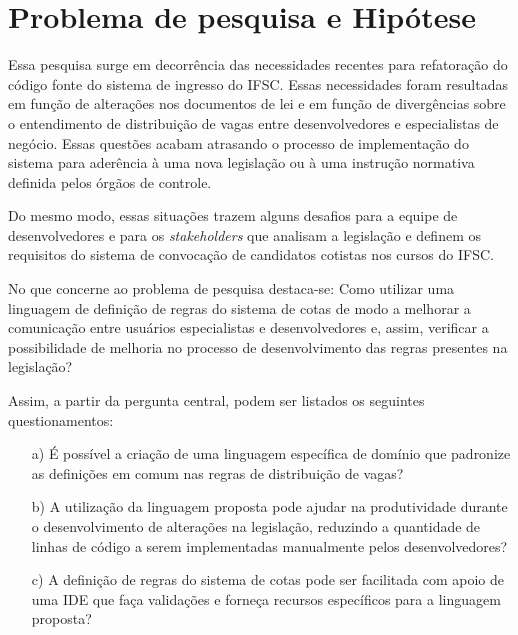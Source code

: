 \section{Problema de pesquisa e Hipótese}
\label{problema}

Essa pesquisa surge em decorrência das necessidades recentes para refatoração do código fonte do sistema de ingresso do \gls{IFSC}. Essas necessidades foram resultadas em função de alterações nos documentos de lei e em função de  divergências sobre o entendimento de distribuição de vagas entre desenvolvedores e especialistas de negócio. Essas questões acabam atrasando o processo de implementação do sistema para aderência à uma nova legislação ou à uma instrução normativa definida pelos órgãos de controle.

Do mesmo modo, essas situações trazem alguns desafios para a equipe de desenvolvedores e para os \textit{stakeholders} que analisam a legislação e definem os requisitos do sistema de convocação de candidatos cotistas nos cursos do \gls{IFSC}. 

No que concerne ao problema de pesquisa destaca-se: 
Como utilizar uma linguagem de definição de regras do sistema de cotas de modo a melhorar a comunicação entre usuários especialistas e desenvolvedores e, assim, verificar a possibilidade de melhoria no processo de desenvolvimento das regras presentes na legislação?

Assim, a partir da pergunta central, podem ser listados os seguintes questionamentos:

\begin{enumerate}
    
    \item[a)] É possível a criação de uma linguagem específica de domínio que padronize as definições em comum nas regras de distribuição de vagas?
    
    \item[b)] A utilização da linguagem proposta pode ajudar na produtividade durante o desenvolvimento de alterações na legislação, reduzindo a quantidade de linhas de código a serem implementadas manualmente pelos desenvolvedores?
    
    \item[c)] A definição de regras do sistema de cotas pode ser facilitada com apoio de uma \gls{IDE} que faça validações e forneça recursos específicos para a linguagem proposta?
    

    
\end{enumerate}